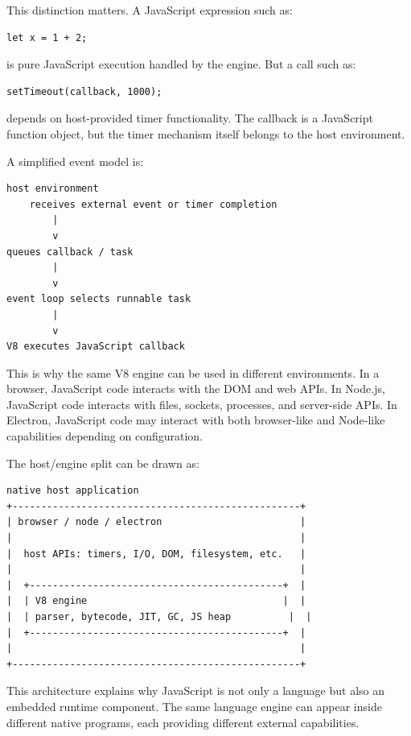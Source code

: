 This distinction matters. A JavaScript expression such as:

\begin{verbatim}
let x = 1 + 2;
\end{verbatim}

is pure JavaScript execution handled by the engine. But a call such as:

\begin{verbatim}
setTimeout(callback, 1000);
\end{verbatim}

depends on host-provided timer functionality. The callback is a JavaScript function object, but the timer mechanism itself belongs to the host environment.

A simplified event model is:

\begin{verbatim}
host environment
    receives external event or timer completion
        |
        v
queues callback / task
        |
        v
event loop selects runnable task
        |
        v
V8 executes JavaScript callback
\end{verbatim}

This is why the same V8 engine can be used in different environments. In a browser, JavaScript code interacts with the DOM and web APIs. In Node.js, JavaScript code interacts with files, sockets, processes, and server-side APIs. In Electron, JavaScript code may interact with both browser-like and Node-like capabilities depending on configuration.

The host/engine split can be drawn as:

\begin{verbatim}
native host application
+--------------------------------------------------+
| browser / node / electron                        |
|                                                  |
|  host APIs: timers, I/O, DOM, filesystem, etc.   |
|                                                  |
|  +--------------------------------------------+  |
|  | V8 engine                                  |  |
|  | parser, bytecode, JIT, GC, JS heap          |  |
|  +--------------------------------------------+  |
|                                                  |
+--------------------------------------------------+
\end{verbatim}

This architecture explains why JavaScript is not only a language but also an embedded runtime component. The same language engine can appear inside different native programs, each providing different external capabilities.

